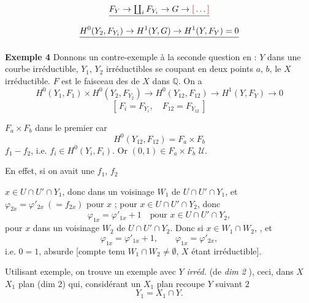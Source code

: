 \documentclass[11pt,a4paper]{article}
\begin{document}
\[
\struck{F_{Y} \to \textstyle\coprod_{i} F_{Y_{i}} \to G \to \ill{}}
\]
\[
\struck{H^{0}(Y_{2}, F_{Y_{i}}) \to H^{1}(Y,G) \to H^{1}(Y, F_{Y}) = 0}
\]

\textbf{Exemple 4} Donnons un contre-exemple à la seconde question en \ill{} : $Y$ \ill{} \ill{} dans une courbe irréductible,
$Y_{1}$, $Y_{2}$ irréductibles se coupant en deux points $a$, $b$, le $X$
irréductible. $F$ est le faisceau des \ill{} de $X$ dans $\mathbb{Q}$. On a
\[
H^{0}(Y_{1}, F_{1}) \times H^{0}(Y_{2}, F_{Y_{2}}) \to
H^{0}(Y_{12}, F_{12}) \to H^{1}(Y, F_{Y}) \to 0
\]
\[
[\,F_{i} = F_{Y_{i}},\quad F_{12} = F_{Y_{12}}\,]
\]

\struck{\ill{}} $F_{a} \times F_{b}$ dans le premier \ill{} \ill{} car
\[
H^{0}(Y_{12}, F_{12}) = F_{a} \times F_{b}
\]
\ill{} $f_{1} - f_{2}$, i.e. $f_{i} \in H^{0}(Y_{i}, F_{i})$. Or
$(0,1) \in F_{a} \times F_{b}$ \ill{} \ill{} $\mathcal{U}$.

En effet, si on avait une \ill{} $f_{1}$, $f_{2}$ \ill{}

$x \in U \cap U' \cap Y_{1}$, donc dans un voisinage $W_{1}$ de
$U \cap U' \cap Y_{1}$, et $\varphi_{2x} = \varphi'_{2x}\ (= f_{2x})$ pour
$x$ \ill{} ;  pour $x \in U \cap U'
\cap Y_{2}$, donc
\[
\varphi_{1x} = \varphi'_{1x} + 1 \quad \text{pour } x \in U \cap U'
\cap Y_{2},
\]
\ill{} pour $x$ dans un voisinage $W_{2}$ de $U \cap U' \cap Y_{2}$. Donc
si $x \in W_{1} \cap W_{2}$, \ill{}, et
\[
\varphi_{1x} = \varphi'_{1x} + 1, \qquad \varphi_{1x} = \varphi'_{2x},
\]
i.e. $0 = 1$, absurde [compte tenu \ill{} $W_{1} \cap W_{2} \ne
\emptyset$, $X$ étant irréductible].

Utilisant \ill{} exemple, on trouve un exemple avec $Y$ \emph{irréd.}
(de \emph{dim 2} \ill{}), \ill{} ceci, dans $X$ \ill{} $X_{1}$ plan
(dim 2) qui, considérant un $X_{1}$ plan \ill{} recoupe $Y$ suivant $2$
\ill{}
\[
Y_{1} = X_{1} \cap Y .
\]
\end{document}
